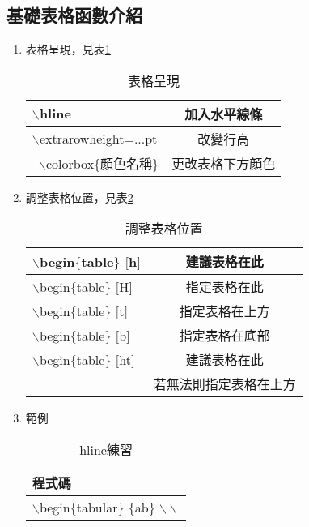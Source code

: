 \subsection{基礎表格函數介紹} 
\begin{enumerate}
\item 表格呈現，見表\ref{show} \\
\begin{table}[H]\caption{表格呈現}\label{show} 
    \centering
    \extrarowheight=5pt   %
{\begin{tabular}{lc}
    \hline
  $\backslash$hline  & 加入水平線條
\\\hline  %
  $\backslash$extrarowheight=...pt  & 改變行高
\\\hline\
  $\backslash$colorbox$\{$顏色名稱$\}$ & 更改表格下方顏色  \\\hline
    \end{tabular}}       
    \end{table}
\item 調整表格位置，見表\ref{site} \\  
\begin{table}[H]\caption{調整表格位置}\label{site} 
    \centering
    \extrarowheight=5pt   %
{\begin{tabular}{lc}
    \hline
  $\backslash$begin$\{$table$\}$ $[$h$]$  & 建議表格在此  		\\\hline  %
  $\backslash$begin$\{$table$\}$ $[$H$]$  & 指定表格在此  		\\\hline
  $\backslash$begin$\{$table$\}$ $[$t$]$  & 指定表格在上方  		\\\hline
  $\backslash$begin$\{$table$\}$ $[$b$]$  & 指定表格在底部  		\\\hline
  $\backslash$begin$\{$table$\}$ $[$ht$]$  & 建議表格在此\\
   &若無法則指定表格在上方  		\\\hline
    \end{tabular}}       
\end{table}  
\item 範例\\
    \begin{table}[H]\caption{hline練習}\label{hline}
    \centering
    \extrarowheight=2pt
    \begin{tabular}{l}
    程式碼\\
    \hline
	$\backslash$begin$\{$tabular$\}$ $\{$ab$\}$ $\backslash\backslash$\\

\end{tabular}
\end{table}
\end{enumerate}
